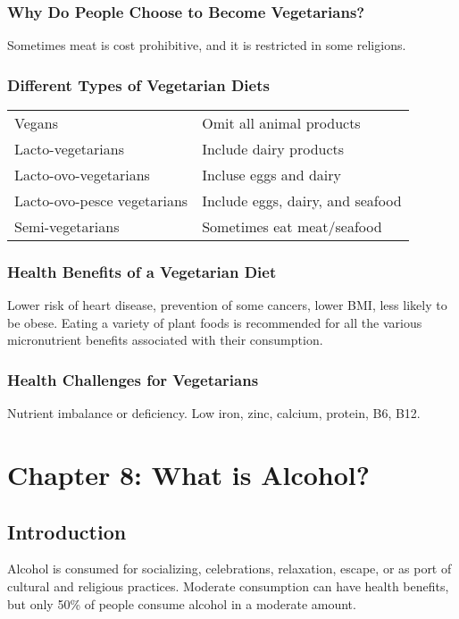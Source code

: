 \documentclass[letterpaper, 11pt]{article}
\begin{document}
\subsubsection{Why Do People Choose to Become Vegetarians?}
\label{sec:org2078031}
Sometimes meat is cost prohibitive, and it is restricted in some religions.\\
\subsubsection{Different Types of Vegetarian Diets}
\label{sec:org7313acc}
\begin{center}
\begin{tabular}{ll}
Vegans & Omit all animal products\\
Lacto-vegetarians & Include dairy products\\
Lacto-ovo-vegetarians & Incluse eggs and dairy\\
Lacto-ovo-pesce vegetarians & Include eggs, dairy, and seafood\\
Semi-vegetarians & Sometimes eat meat/seafood\\
\end{tabular}
\end{center}
\subsubsection{Health Benefits of a Vegetarian Diet}
\label{sec:orgef50257}
Lower risk of heart disease, prevention of some cancers, lower BMI, less likely to be obese. Eating a variety of plant foods is recommended for all the various micronutrient benefits associated with their consumption.\\
\subsubsection{Health Challenges for Vegetarians}
\label{sec:orgbc8b44e}
Nutrient imbalance or deficiency. Low iron, zinc, calcium, protein, B6, B12.\\
\section{Chapter 8: What is Alcohol?}
\label{sec:orgbfb7ac8}
\subsection{Introduction}
\label{sec:org96e5273}
Alcohol is consumed for socializing, celebrations, relaxation, escape, or as port of cultural and religious practices. Moderate consumption can have health benefits, but only 50\% of people consume alcohol in a moderate amount.\\
\end{document}

